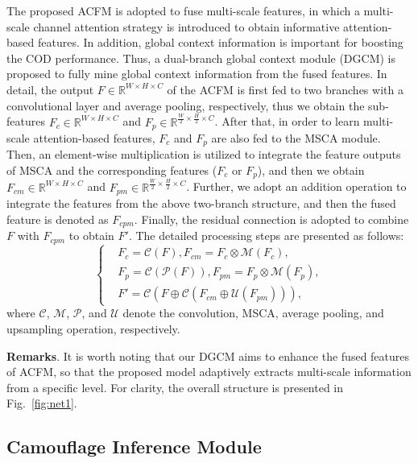 \documentclass[lettersize,journal]{IEEEtran}
\begin{document}
The proposed ACFM is adopted to fuse multi-scale features, in which a multi-scale channel attention strategy is introduced to obtain informative attention-based features. In addition, global context information is important for boosting the COD performance. Thus, a dual-branch global context module (DGCM) is proposed to fully mine global context information from the fused features. In detail, the output $F\in\mathbb{R}^{{W}\times{H}\times{C}}$ of the ACFM is first fed to two branches with a convolutional layer and average pooling, respectively, thus we obtain the sub-features $F_{c}\in\mathbb{R}^{{W}\times{H}\times{C}}$ and $F_{p}\in\mathbb{R}^{{\frac{W}{2}}\times{\frac{H}{2}}\times{C}}$. After that, in order to learn multi-scale attention-based features, $F_{c}$ and $F_{p}$ are also fed to the MSCA module. Then, an element-wise multiplication is utilized to integrate the feature outputs of MSCA and the corresponding features ($F_{c}$ or $F_{p}$), and then we obtain $F_{cm}\in\mathbb{R}^{{W}\times{H}\times{C}}$ and $F_{pm}\in\mathbb{R}^{{\frac{W}{2}}\times{\frac{H}{2}}\times{C}}$. Further, we adopt an addition operation to integrate the features from the above two-branch structure, and then the fused feature is denoted as $F_{cpm}$. Finally, the residual connection is adopted to combine $F$ with $F_{cpm}$ to obtain ${F}'$. The detailed processing steps are presented as follows:
\begin{equation}
\left\{
\begin{aligned}
&F_{c}= \mathcal{C}\left ( F \right ), F_{cm}= F_{c}\otimes \mathcal{M}\left ( F_{c} \right ),\\
&F_{p}= \mathcal{C}\left( \mathcal{P} \left ( F \right )\right), F_{pm}= F_{p}\otimes \mathcal{M} \left ( F_{p} \right ),\\
&{F}'= \mathcal{C} \left ( F\oplus \mathcal {C} \left ( F_{cm} \oplus \mathcal{U} \left ( F_{pm} \right )\right ) \right ),
\end{aligned}
\right.
\label{eq01}
\end{equation}
where $\mathcal{C}$, $\mathcal{M}$, $\mathcal{P}$, and $\mathcal{U}$ denote the convolution, MSCA, average pooling, and upsampling operation, respectively.

\textbf{Remarks}. It is worth noting that our DGCM aims to enhance the fused features of ACFM, so that the proposed model adaptively extracts multi-scale information from a specific level. For clarity, the overall structure is presented in Fig.~\ref{fig:net1}.

\subsection{Camouflage Inference Module}\label{cim}
\end{document}
